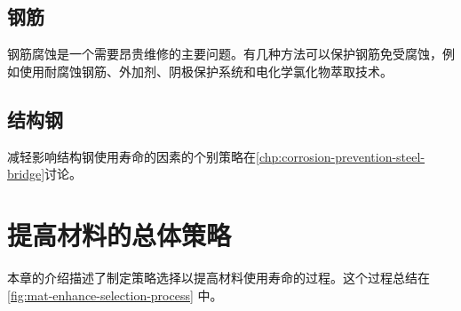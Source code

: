 \subsection{钢筋}
钢筋腐蚀是一个需要昂贵维修的主要问题。有几种方法可以保护钢筋免受腐蚀，例如使用耐腐蚀钢筋、外加剂、阴极保护系统和电化学氯化物萃取技术。

\subsection{结构钢}
减轻影响结构钢使用寿命的因素的个别策略在\cref{chp:corrosion-prevention-steel-bridge}讨论。

\section{提高材料的总体策略}
\label{sec:overall-strategies}
本章的介绍描述了制定策略选择以提高材料使用寿命的过程。这个过程总结在\cref{fig:mat-enhance-selection-process} 中。

